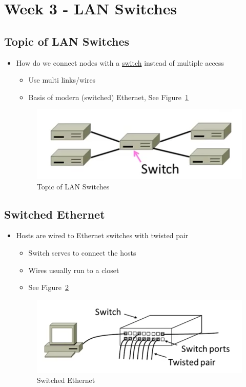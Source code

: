 \documentclass[12pt]{ctexart}   %
\begin{document}
\section{Week 3 - LAN Switches}
	\subsection{Topic of LAN Switches}
	\begin{itemize}
		\item How do we connect nodes with a \underline{switch} instead of multiple access
		\begin{itemize}
			\item Use multi links/wires
			\item Basis of modern (switched) Ethernet,  See Figure~\ref{fig:3-7-1}
		\end{itemize}
		
		\begin{figure}[h!] %
		\centering
		 \includegraphics[scale=0.7]{images/3-7-1}
		\caption{ Topic of LAN Switches }
		 \label{fig:3-7-1}
		 \end{figure}
	\end{itemize}
	
	\subsection{ Switched Ethernet }
	\begin{itemize}
		\item Hosts are wired to Ethernet switches with twisted pair
		\begin{itemize}
			\item Switch serves to connect the hosts
			\item Wires usually run to a closet
			\item See Figure~\ref{fig:3-7-2}
		\end{itemize}
		
		\begin{figure}[h!] %
		\centering
		 \includegraphics[scale=0.7]{images/3-7-2}
		\caption{ Switched Ethernet }
		 \label{fig:3-7-2}
		 \end{figure}
	\end{itemize}
	
\end{document}
